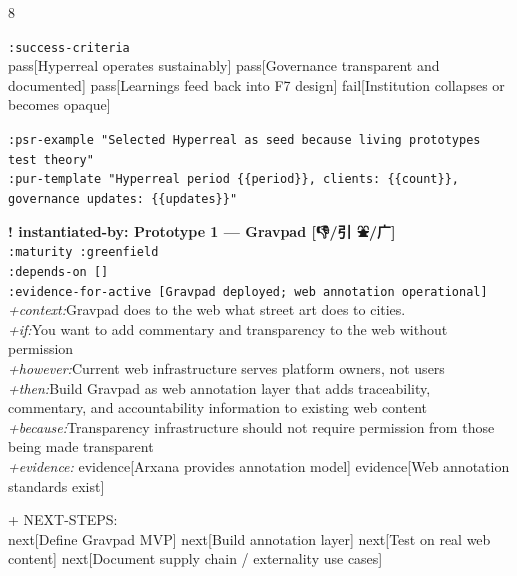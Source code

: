 \documentclass[landscape]{article}
\newcommand{\flexitag}[1]{\textcolor[gray]{0.35}{\textit{#1}}}
\newenvironment{devmapgreenfield}{%
  \def\FrameCommand{\colorbox{devmapgreenfieldbg}}%
  \setlength{\fboxsep}{2pt}%
  \MakeFramed{\advance\hsize-\width \FrameRestore}%
}{\endMakeFramed}
\begin{document}
\begin{paracol}{8}
\begin{devmapgreenfield}
  \texttt{:\allowbreak{}success-\allowbreak{}criteria}\\
    pass[Hyperreal operates sustainably] pass[Governance transparent and documented] pass[Learnings feed back into F7 design] fail[Institution collapses or becomes opaque]\\
\par
  \texttt{:\allowbreak{}psr-\allowbreak{}example "Selected Hyperreal as seed because living prototypes test theory"}\\
  \texttt{:\allowbreak{}pur-\allowbreak{}template "Hyperreal period \{\{period\}\},\allowbreak{} clients:\allowbreak{} \{\{count\}\},\allowbreak{} governance updates:\allowbreak{} \{\{updates\}\}"}\\
\par
\par
\end{devmapgreenfield}
\begin{devmapgreenfield}
\textbf{! instantiated-by: Prototype 1 — Gravpad [👎/引 ⛲️/广]}\\
  \texttt{:\allowbreak{}maturity :\allowbreak{}greenfield}\\
  \texttt{:\allowbreak{}depends-\allowbreak{}on []}\\
  \texttt{:\allowbreak{}evidence-\allowbreak{}for-\allowbreak{}active [Gravpad deployed;\allowbreak{} web annotation operational]}\\
  \flexitag{+context:}Gravpad does to the web what street art does to cities.\\
  \flexitag{+if:}You want to add commentary and transparency to the web without permission\\
  \flexitag{+however:}Current web infrastructure serves platform owners, not users\\
  \flexitag{+then:}Build Gravpad as web annotation layer that adds traceability, commentary, and accountability information to existing web content\\
  \flexitag{+because:}Transparency infrastructure should not require permission from those being made transparent\\
  \flexitag{+evidence:} evidence[Arxana provides annotation model] evidence[Web annotation standards exist]\\
\par
  + NEXT-STEPS:\\
    next[Define Gravpad MVP] next[Build annotation layer] next[Test on real web content] next[Document supply chain / externality use cases]\\

\end{devmapgreenfield}
\end{paracol}
\end{document}
